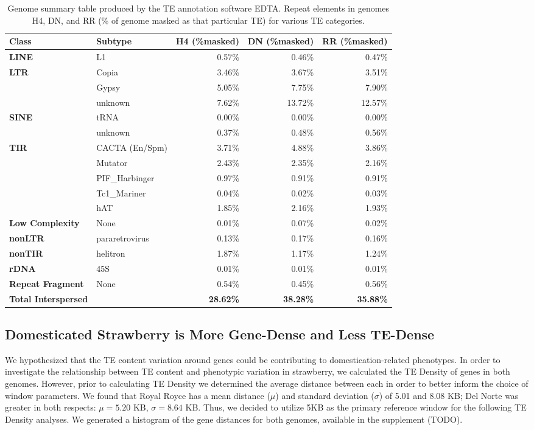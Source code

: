 \documentclass[fleqn,10pt]{olplainarticle}
\begin{document}
\begin{table}[ht]
\centering
\begin{tabularx}{\textwidth}{l|X|r|r|r}
\toprule
\textbf{Class} & \textbf{Subtype} & \textbf{H4 (\%masked)} & \textbf{DN (\%masked)} & \textbf{RR (\%masked)} \\
\toprule
\textbf{LINE} & L1 & 0.57\% & 0.46\% & 0.47\% \\
\textbf{LTR} & Copia & 3.46\% & 3.67\% & 3.51\% \\
& Gypsy & 5.05\% & 7.75\% & 7.90\% \\
& unknown & 7.62\% & 13.72\% & 12.57\% \\
\textbf{SINE} & tRNA & 0.00\% & 0.00\% & 0.00\% \\
& unknown & 0.37\% & 0.48\% & 0.56\% \\
	\textbf{TIR} & CACTA (En/Spm) & 3.71\% & 4.88\% & 3.86\% \\
& Mutator & 2.43\% & 2.35\% & 2.16\% \\
& PIF\_Harbinger & 0.97\% & 0.91\% & 0.91\% \\
& Tc1\_Mariner & 0.04\% & 0.02\% & 0.03\% \\
& hAT & 1.85\% & 2.16\% & 1.93\% \\
\textbf{Low Complexity} & None & 0.01\% & 0.07\% & 0.02\% \\
\textbf{nonLTR} & pararetrovirus & 0.13\% & 0.17\% & 0.16\% \\
\textbf{nonTIR} & helitron & 1.87\% & 1.17\% & 1.24\% \\
\textbf{rDNA} & 45S & 0.01\% & 0.01\% & 0.01\% \\
\textbf{Repeat Fragment} & None & 0.54\% & 0.45\% & 0.56\% \\
\toprule
\textbf{Total Interspersed} & & \textbf{28.62\%} & \textbf{38.28\%} & \textbf{35.88\%} \\
\bottomrule
\end{tabularx}
\caption{Genome summary table produced by the TE annotation software EDTA. Repeat elements in genomes H4, DN, and RR (\% of genome masked as that particular TE) for various TE categories.}
\label{tab:EDTA_Summary}
\end{table}

\subsection*{Domesticated Strawberry is More Gene-Dense and Less TE-Dense}
We hypothesized that the TE content variation around genes could be contributing to domestication-related phenotypes.
In order to investigate the relationship between TE content and phenotypic variation in strawberry, we calculated the TE Density of genes in both genomes.
However, prior to calculating TE Density we determined the average distance between each in order to better inform the choice of window parameters.
We found that Royal Royce has a mean distance ($\mu$) and standard deviation ($\sigma$) of 5.01 and 8.08 KB; Del Norte was greater in both respects: $\mu = 5.20$ KB, $\sigma = 8.64$ KB.
Thus, we decided to utilize 5KB as the primary reference window for the following TE Density analyses.
We generated a histogram of the gene distances for both genomes, available in the supplement (TODO).
\end{document}
